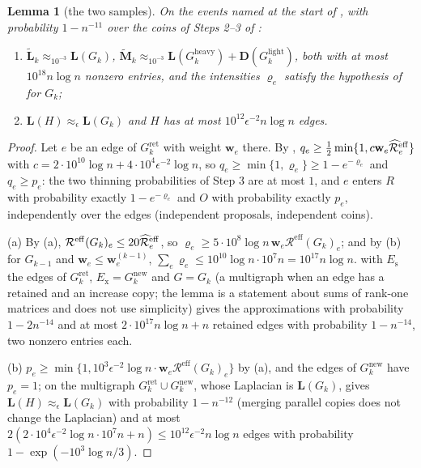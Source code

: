 \documentclass[11pt]{article}
\newtheorem{lemma}[theorem]{Lemma}
\theoremstyle{remark}
\newcommand{\DD}{\mathbf D}
\newcommand{\LL}{\mathbf L}
\newcommand{\LLtil}{{\widetilde{\LL}}}
\newcommand{\MM}{\mathbf M}
\newcommand{\MMtil}{{\widetilde{\MM}}}
\newcommand{\ww}{\mathbf w}
\newcommand{\Gh}{G^{\mathrm{heavy}}}
\newcommand{\Gl}{G^{\mathrm{light}}}
\newcommand{\Gret}{G^{\mathrm{ret}}}
\newcommand{\Gnew}{G^{\mathrm{new}}}
\newcommand{\Rcal}{\mathcal{R}}
\newcommand{\Reff}{\Rcal^{\mathrm{eff}}}
\newcommand{\Reffref}{\mathrlap{\widehat{\phantom{\Rcal}\mkern4mu}}\Rcal^{\mathrm{eff}}}
\begin{document}
\begin{lemma}[the two samples]\label{lem:samples}
On the events named at the start of , with probability
$1-n^{-11}$ over the coins of Steps 2--3 of :
\begin{enumerate}[label=(\alph*),leftmargin=*]
\item $\LLtil_k\approx_{10^{-3}}\LL(G_k)$, $\MMtil_k\approx_{10^{-3}}\LL(\Gh_k)+\DD(\Gl_k)$,
both with at most $10^{18}n\log n$ nonzero entries, and the intensities
$\varrho_e$ satisfy the hypothesis of  for $G_k$;
\item $\LL(H)\approx_{\epsilon}\LL(G_k)$ and $H$ has at most
$10^{12}\epsilon^{-2}n\log n$ edges.
\end{enumerate}
\end{lemma}
\begin{proof}
Let $e$ be an edge of $\Gret_k$ with weight $\ww_e$ there.
By , $q_e\ge\frac12\min\{1,c\ww_e\Reffref_e\}$ with
$c=2\cdot10^{10}\log n+4\cdot10^{4}\epsilon^{-2}\log n$, so
$q_e\ge\min\{1,\varrho_e\}\ge1-e^{-\varrho_e}$ and $q_e\ge p_e$: the two
thinning probabilities of Step 3 are at most $1$, and $e$ enters $R$ with
probability exactly $1-e^{-\varrho_e}$ and $O$ with probability exactly
$p_e$, independently over the edges (independent proposals, independent
coins).

(a) By (a), $\Reff(G_k)_e\le20\Reffref_e$, so
$\varrho_e\ge5\cdot10^{8}\log n\,\ww_e\Reff(G_k)_e$; and by
(b) for $G_{k-1}$ and $\ww_e\le\ww^{(k-1)}_e$,
$\sum_e\varrho_e\le10^{10}\log n\cdot10^{7}n=10^{17}n\log n$.
 with $E_{\mathrm{s}}$ the edges of $\Gret_k$,
$E_{\mathrm{x}}=\Gnew_k$ and $G=G_k$ (a multigraph when an edge has a retained
and an increase copy; the lemma is a statement about sums of rank-one
matrices and does not use simplicity) gives the approximations with
probability $1-2n^{-14}$ and at most $2\cdot10^{17}n\log n+n$ retained edges
with probability $1-n^{-14}$, two nonzero entries each.

(b) $p_e\ge\min\{1,10^{3}\epsilon^{-2}\log n\cdot\ww_e\Reff(G_k)_e\}$ by
(a), and the edges of $\Gnew_k$ have $p_e=1$;
 on the multigraph $\Gret_k\cup\Gnew_k$, whose Laplacian
is $\LL(G_k)$, gives $\LL(H)\approx_{\epsilon}\LL(G_k)$ with probability
$1-n^{-12}$ (merging parallel copies does not change the Laplacian) and
at most $2(2\cdot10^{4}\epsilon^{-2}\log n\cdot10^{7}n+n)\le10^{12}\epsilon^{-2}n\log n$
edges with probability $1-\exp(-10^{3}\log n/3)$.
\end{proof}
\end{document}
